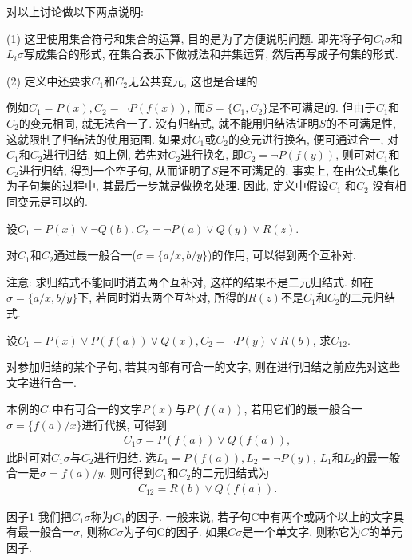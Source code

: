 对以上讨论做以下两点说明:

(1) 这里使用集合符号和集合的运算, 目的是为了方便说明问题. 即先将子句$C_i\sigma$和$L_i\sigma$写成集合的形式, 在集合表示下做减法和并集运算, 然后再写成子句集的形式.

(2) 定义中还要求$C_1$和$C_2$无公共变元, 这也是合理的.
\begin{example}
例如$C_1=P(x), C_2=\neg P(f(x))$, 而$S=\{C_1,  C_2\}$是不可满足的. 但由于$C_1$和$C_2$的变元相同, 就无法合一了. 没有归结式, 就不能用归结法证明$S$的不可满足性, 这就限制了归结法的使用范围.
如果对$C_1$或$C_2$的变元进行换名, 便可通过合一, 对$C_1$和$C_2$进行归结. 如上例, 若先对$C_2$进行换名, 即$C_2=\neg P(f(y))$, 则可对$C_1$和$C_2$进行归结, 得到一个空子句, 从而证明了$S$是不可满足的.
事实上, 在由公式集化为子句集的过程中, 其最后一步就是做换名处理. 因此, 定义中假设$C_1$ 和$C_2$ 没有相同变元是可以的.
\end{example}
\begin{example}
  设$C_1=P(x)\vee \neg Q(b), C_2=\neg P(a)\vee Q(y)\vee R(z)$.
\end{example}
\begin{result}
  对$C_1$和$C_2$通过最一般合一($\sigma =\{a/x, b/y\}$)的作用, 可以得到两个互补对.
\end{result}
\begin{remark}
注意: 求归结式不能同时消去两个互补对, 这样的结果不是二元归结式. 如在$\sigma =\{a/x, b/y\}$下, 若同时消去两个互补对, 所得的$R(z)$不是$C_1$和$C_2$的二元归结式.
\end{remark}

\begin{example}
  设$C_1=P(x)\vee P(f(a))\vee Q(x) , C_2=\neg P(y)\vee R(b)$, 求$C_{1 2}$.
\end{example}
\begin{result}
对参加归结的某个子句, 若其内部有可合一的文字, 则在进行归结之前应先对这些文字进行合一.

本例的$C_1$中有可合一的文字$P(x)$与$P(f(a))$, 若用它们的最一般合一$\sigma =\{f(a)/x\}$进行代换, 可得到
\begin{align}
    C_1\sigma =P(f(a))\vee Q(f(a)),
\end{align}
此时可对$C_1\sigma$与$C_2$进行归结. 选$L_1= P(f(a)), L_2 =\neg P(y)$, $L_1$和$L_2$的最一般合一是$\sigma={f(a)/y}$, 则可得到$C_1$和$C_2$的二元归结式为
\begin{align}
  C_{12}=R(b)\vee Q(f(a)).
\end{align}
\end{result}
\begin{mydef}{因子}{1}
  我们把$C_1\sigma$称为$C_1$的因子. 一般来说, 若子句C中有两个或两个以上的文字具有最一般合一$\sigma$, 则称$C\sigma$为子句C的因子. 如果$C\sigma$是一个单文字, 则称它为$C$的单元因子.
\end{mydef}

